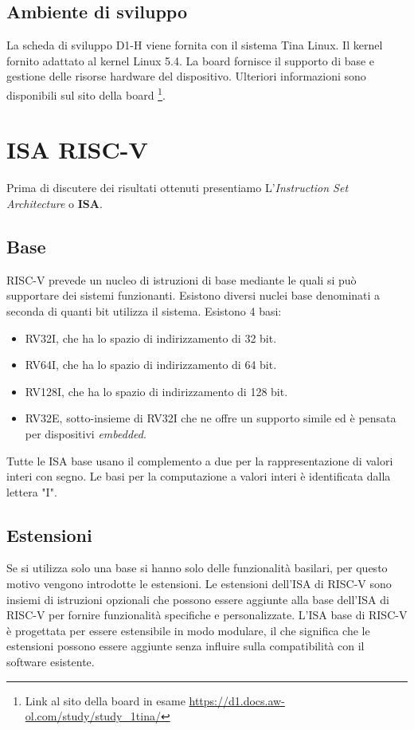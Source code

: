 \documentclass[12pt, a4paper]{report}
\begin{document}
\section{Ambiente di sviluppo}
La scheda di sviluppo D1-H viene fornita con il sistema Tina Linux. Il kernel fornito adattato al kernel Linux 5.4. La board fornisce il supporto di base e gestione delle risorse hardware del dispositivo. Ulteriori informazioni sono disponibili sul sito della board
\footnote{Link al sito della board in esame \url{https://d1.docs.aw-ol.com/study/study_1tina/}}.


% 
\chapter{ISA RISC-V}
Prima di discutere dei risultati ottenuti presentiamo L'\textit{Instruction Set Architecture} o \textbf{ISA}.
\section{Base}
RISC-V prevede un nucleo di istruzioni di base mediante le quali si può supportare dei sistemi funzionanti. Esistono diversi nuclei base denominati a seconda di quanti bit utilizza il sistema. Esistono 4 basi:
\begin{itemize}
	\item RV32I, che ha lo spazio di indirizzamento di 32 bit. 
	\item RV64I, che ha lo spazio di indirizzamento di 64 bit.
	\item RV128I, che ha lo spazio di indirizzamento di 128 bit.
	\item RV32E, sotto-insieme di RV32I che ne offre un supporto simile ed è pensata per dispositivi \textit{embedded}.
\end{itemize}
Tutte le ISA base usano il complemento a due per la rappresentazione di valori interi con segno. Le basi per la computazione a valori interi è identificata dalla lettera "I". 

\section{Estensioni} \label{estensioni}
Se si utilizza solo una base si hanno solo delle funzionalità basilari, per questo motivo vengono introdotte le estensioni. Le estensioni dell'ISA di RISC-V sono insiemi di istruzioni opzionali che possono essere aggiunte alla base dell'ISA di RISC-V per fornire funzionalità specifiche e personalizzate. L'ISA base di RISC-V è progettata per essere estensibile in modo modulare, il che significa che le estensioni possono essere aggiunte senza influire sulla compatibilità con il software esistente.
\end{document}
